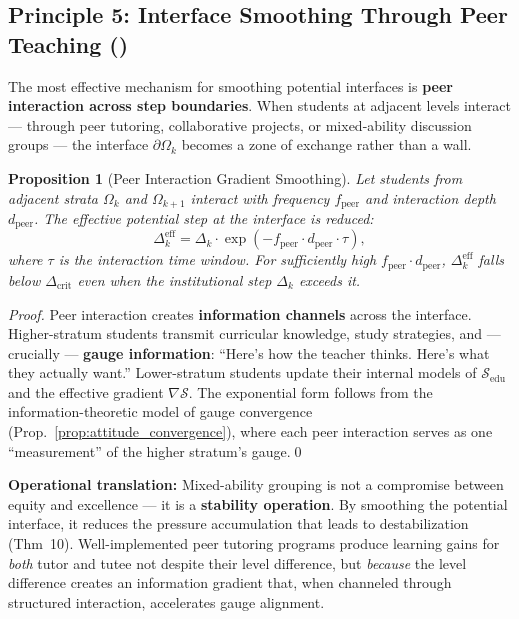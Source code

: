\documentclass[11pt,a4paper]{article}
\newtheorem{proposition}[theorem]{Proposition}
\newcommand{\cS}{\mathcal{S}}
\newcommand{\gradS}{\nabla\mathcal{S}}
\begin{document}
\subsection{Principle 5: Interface Smoothing Through Peer Teaching ()}
The most effective mechanism for smoothing potential interfaces is \textbf{peer interaction across step boundaries}. When students at adjacent levels interact — through peer tutoring, collaborative projects, or mixed-ability discussion groups — the interface $\partial\Omega_k$ becomes a zone of exchange rather than a wall.
\begin{proposition}[Peer Interaction Gradient Smoothing]
\label{prop:peer_smoothing}
Let students from adjacent strata $\Omega_k$ and $\Omega_{k+1}$ interact with frequency $f_{\text{peer}}$ and interaction depth $d_{\text{peer}}$. The effective potential step at the interface is reduced:
\begin{equation}
    \Delta_k^{\text{eff}} = \Delta_k \cdot \exp\left(-f_{\text{peer}} \cdot d_{\text{peer}} \cdot \tau\right),
\end{equation}
where $\tau$ is the interaction time window. For sufficiently high $f_{\text{peer}} \cdot d_{\text{peer}}$, $\Delta_k^{\text{eff}}$ falls below $\Delta_{\text{crit}}$ even when the institutional step $\Delta_k$ exceeds it.
\end{proposition}
\begin{proof}
Peer interaction creates \textbf{information channels} across the interface. Higher-stratum students transmit curricular knowledge, study strategies, and — crucially — \textbf{gauge information}: ``Here's how the teacher thinks. Here's what they actually want.'' Lower-stratum students update their internal models of $\cS_{\text{edu}}$ and the effective gradient $\gradS$. The exponential form follows from the information-theoretic model of gauge convergence (Prop.~\ref{prop:attitude_convergence}), where each peer interaction serves as one ``measurement'' of the higher stratum's gauge.\qed
\end{proof}
\textbf{Operational translation:} Mixed-ability grouping is not a compromise between equity and excellence — it is a \textbf{stability operation}. By smoothing the potential interface, it reduces the pressure accumulation that leads to destabilization (Thm~10). Well-implemented peer tutoring programs produce learning gains for \textit{both} tutor and tutee not despite their level difference, but \textit{because} the level difference creates an information gradient that, when channeled through structured interaction, accelerates gauge alignment.
\end{document}
